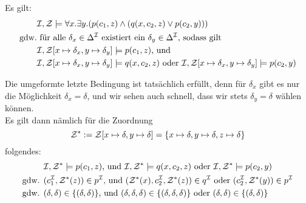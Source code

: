 \begin{enumerate}
        Es gilt:
        \begin{align*}
            &\mathcal{I}, \mathcal{Z} \models \forall x.\exists y.(p(c_1,z) \land (q(x,c_2,z) \lor p(c_2,y))) \\
            \text{gdw.} & \text{ für alle } \delta_x \in \Delta^{\mathcal{I}} \text{ existiert ein } \delta_y \in \Delta^{\mathcal{I}} \text{, sodass gilt} \\
            &\mathcal{I},\mathcal{Z} [x \mapsto \delta_x, y \mapsto \delta_y ] \models p(c_1, z) \text{, und} \\
            &\mathcal{I},\mathcal{Z} [x \mapsto \delta_x, y \mapsto \delta_y ] \models q(x,c_2,z) \text{ oder } \mathcal{I},\mathcal{Z} [x \mapsto \delta_x, y \mapsto \delta_y ] \models p(c_2,y)
        \end{align*}

        Die umgeformte letzte Bedingung ist tatsächlich erfüllt, denn für $\delta_x$ gibt es nur die Möglichkeit $\delta_x=\delta$, und wir sehen auch schnell, dass wir stets $\delta_y=\delta$ wählen können. \\
        Es gilt dann nämlich für die Zuordnung
        \begin{equation*}
        \mathcal{Z}^* := \mathcal{Z}[x \mapsto \delta, y \mapsto \delta] = \{x \mapsto \delta, y \mapsto \delta, z \mapsto \delta \}
        \end{equation*}
        folgendes:
        \begin{align*}
            & \mathcal{I}, \mathcal{Z}^* \models p(c_1, z) \text{, und } \mathcal{I}, \mathcal{Z}^* \models q(x,c_2,z) \text{ oder } \mathcal{I},\mathcal{Z}^* \models p(c_2,y) \\
            \text{gdw. } & (c_1^{\mathcal{I}}, \mathcal{Z}^*(z)) \in p^{\mathcal{I}} \text{, und } (\mathcal{Z}^*(x), c_2^{\mathcal{I}}, \mathcal{Z}^*(z)) \in q^{\mathcal{I}} \text{ oder } (c_2^{\mathcal{I}}, \mathcal{Z}^*(y)) \in p^{\mathcal{I}} \\
            \text{gdw. } & (\delta, \delta) \in \{(\delta, \delta)\} \text{, und } (\delta, \delta, \delta) \in \{(\delta, \delta, \delta)\} \text{ oder } (\delta,\delta) \in \{(\delta, \delta) \}
        \end{align*}
    \end{enumerate}


